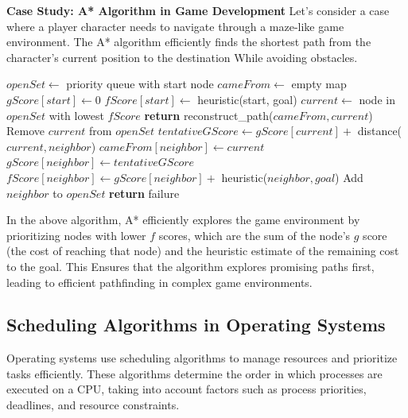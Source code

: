 \documentclass[12pt]{book} %
\begin{document}
\textbf{Case Study: A* Algorithm in Game Development}
Let's consider a case where a player character needs to navigate through a maze-like game environment. The A* algorithm efficiently finds the shortest path from the character's current position to the destination While avoiding obstacles.

\FloatBarrier
\begin{algorithm}
\caption{A* Algorithm}
\begin{algorithmic}[1]
    \State $openSet \gets$ priority queue with start node
    \State $cameFrom \gets$ empty map
    \State $gScore[start] \gets 0$
    \State $fScore[start] \gets$ heuristic(start, goal)
        \State $current \gets$ node in $openSet$ with lowest $fScore$
            \State \textbf{return} reconstruct\_path($cameFrom, current$)
        \EndIf
        \State Remove $current$ from $openSet$
            \State $tentativeGScore \gets gScore[current] +$ distance($current, neighbor$)
                \State $cameFrom[neighbor] \gets current$
                \State $gScore[neighbor] \gets tentativeGScore$
                \State $fScore[neighbor] \gets gScore[neighbor] +$ heuristic($neighbor, goal$)
                    \State Add $neighbor$ to $openSet$
                \EndIf
            \EndIf
        \EndFor
    \EndWhile
    \State \textbf{return} failure
\EndProcedure
\end{algorithmic}
\end{algorithm}
\FloatBarrier

In the above algorithm, A* efficiently explores the game environment by prioritizing nodes with lower $f$ scores, which are the sum of the node's $g$ score (the cost of reaching that node) and the heuristic estimate of the remaining cost to the goal. This Ensures that the algorithm explores promising paths first, leading to efficient pathfinding in complex game environments.

\subsection{Scheduling Algorithms in Operating Systems}
Operating systems use scheduling algorithms to manage resources and prioritize tasks efficiently. These algorithms determine the order in which processes are executed on a CPU, taking into account factors such as process priorities, deadlines, and resource constraints.
\end{document}

